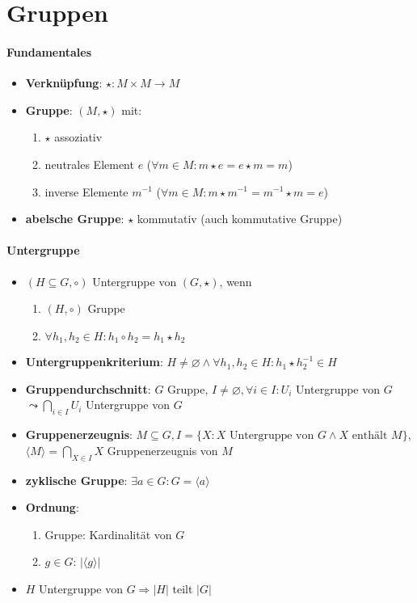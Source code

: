 \section{\label{sec:Gruppen}Gruppen}

\paragraph{Fundamentales}
\begin{itemize}
  \item \textbf{Verknüpfung}: $\star : M \times M \rightarrow M$
  \item \textbf{Gruppe}: $(M,\star)$ mit:
    \begin{enumerate}
      \item $\star$ assoziativ
      \item neutrales Element $e$ ($\forall m \in M: m \star e = e \star m = m$)
      \item inverse Elemente $m^{-1}$ ($\forall m \in M: m \star m^{-1} = m^{-1} \star m = e$)
    \end{enumerate}
  \item \textbf{abelsche Gruppe}: $\star$ kommutativ (auch kommutative Gruppe)
\end{itemize}

\paragraph{Untergruppe}
\begin{itemize}
  \item $(H \subseteq G, \circ)$ Untergruppe von $(G, \star)$, wenn
  \begin{enumerate}
    \item $(H, \circ)$ Gruppe
    \item $\forall h_1, h_2 \in H: h_1 \circ h_2 = h_1 \star h_2$
  \end{enumerate}
  \item \textbf{Untergruppenkriterium}: $H \neq \varnothing \wedge \forall h_1, h_2 \in H: h_1 \star h_2^{-1} \in H$
  \item \textbf{Gruppendurchschnitt}: $G$ Gruppe, $I \neq \varnothing, \forall i \in I: U_i$ Untergruppe von $G$ $\leadsto \bigcap_{i \in I} U_i$ Untergruppe von $G$
  \item \textbf{Gruppenerzeugnis}: $M \subseteq G, I=\{ X: X \text{ Untergruppe von } G \wedge X \text{ enthält } M\}$, $\langle M \rangle=\bigcap_{X \in I} X$ Gruppenerzeugnis von $M$
  \item \textbf{zyklische Gruppe}: $\exists a \in G: G = \langle a \rangle$
  \item \textbf{Ordnung}:
  \begin{enumerate}
    \item Gruppe: Kardinalität von $G$
    \item $g \in G$: $|\langle g \rangle |$
  \end{enumerate}
  \item $H$ Untergruppe von $G \Rightarrow |H|$ teilt $|G|$
\end{itemize}

